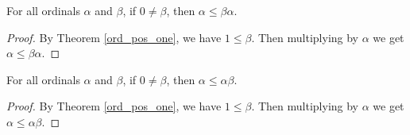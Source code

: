 \documentclass[../../math.tex]{subfiles}
\begin{document}
\begin{theorem} \label{ord_le_self_lmult}
    For all ordinals $\alpha$ and $\beta$, if $0 \neq \beta$, then $\alpha \leq
    \beta \alpha$.
\end{theorem}
\begin{proof}
    By Theorem \ref{ord_pos_one}, we have $1 \leq \beta$.  Then multiplying by
    $\alpha$ we get $\alpha \leq \beta \alpha$.
\end{proof}

\begin{theorem} \label{ord_le_self_rmult}
    For all ordinals $\alpha$ and $\beta$, if $0 \neq \beta$, then $\alpha \leq
    \alpha \beta$.
\end{theorem}
\begin{proof}
    By Theorem \ref{ord_pos_one}, we have $1 \leq \beta$.  Then multiplying by
    $\alpha$ we get $\alpha \leq \alpha \beta$.
\end{proof}
\end{document}
